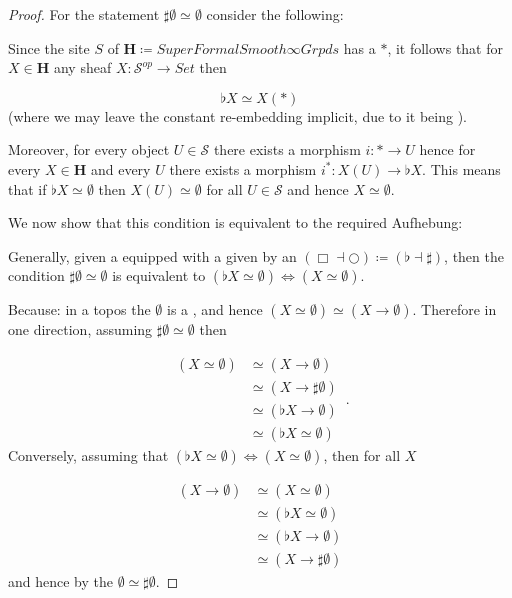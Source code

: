 \documentclass[12pt,titlepage]{article}
\theoremstyle{plain}
\theoremstyle{definition}
\theoremstyle{remark}
\begin{document}
\begin{proof}
For the statement $\sharp \emptyset \simeq \emptyset$ consider the following:

Since the site $S$ of $\mathbf{H} \coloneqq SuperFormalSmooth\infty Grpds$ has a  $\ast$, it follows that for $X\in \mathbf{H}$ any sheaf $X \colon \mathcal{S}^{op}\to Set$ then

\begin{displaymath}
\flat X \simeq X(\ast)
\end{displaymath}
(where we may leave the constant re-embedding implicit, due to it being ).

Moreover, for every object $U\in \mathcal{S}$ there exists a morphism $i \colon \ast \to U$ hence for every $X\in \mathbf{H}$ and every $U$ there exists a morphism $i^\ast \colon X(U)\to \flat X$. This means that if $\flat X \simeq \emptyset$ then $X(U) \simeq \emptyset$ for all $U \in \mathcal{S}$ and hence $X\simeq \emptyset$.

We now show that this condition is equivalent to the required Aufhebung:

Generally, given a  equipped with a  given by an  $(\Box\dashv \bigcirc) \coloneqq (\flat \dashv \sharp)$, then the condition $\sharp \emptyset \simeq \emptyset$ is equivalent to $(\flat X \simeq \emptyset) \Leftrightarrow (X \simeq \emptyset)$.

Because: in a topos the  $\emptyset$ is a , and hence $(X \simeq \emptyset) \simeq (X \to \emptyset)$. Therefore in one direction, assuming $\sharp \emptyset \simeq \emptyset$ then

\begin{displaymath}
\begin{aligned}
    (X \simeq \emptyset)
    & \simeq
    (X \to \emptyset)
    \\
    & \simeq (X \to \sharp \emptyset)
    \\
    & \simeq (\flat X \to \emptyset)
    \\
    & \simeq (\flat X \simeq \emptyset)
  \end{aligned}
  \,.
\end{displaymath}
Conversely, assuming that $(\flat X \simeq \emptyset) \Leftrightarrow (X \simeq \emptyset)$, then for all $X$

\begin{displaymath}
\begin{aligned}
    (X\to \emptyset)
    & \simeq
    (X\simeq \emptyset)
   \\
    & \simeq (\flat X \simeq \emptyset)
    \\
    & \simeq (\flat X \to \emptyset)
    \\
    & \simeq (X\to \sharp \emptyset)
  \end{aligned}
\end{displaymath}
and hence by the  $\emptyset \simeq \sharp \emptyset$.


\end{proof}
\end{document}
